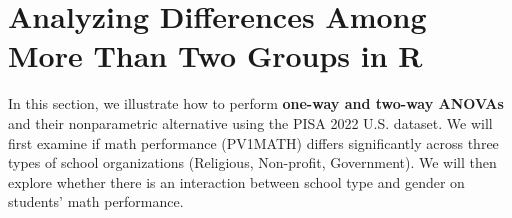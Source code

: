 \documentclass[
  letterpaper,
  DIV=11,
  numbers=noendperiod]{scrreprt}
\begin{document}

\chapter*{Analyzing Differences Among More Than Two Groups in
R}\label{analyzing-differences-among-more-than-two-groups-in-r}


In this section, we illustrate how to perform \textbf{one-way and
two-way ANOVAs} and their nonparametric alternative using the PISA 2022
U.S. dataset. We will first examine if math performance (PV1MATH)
differs significantly across three types of school organizations
(Religious, Non-profit, Government). We will then explore whether there
is an interaction between school type and gender on students' math
performance.
\end{document}
